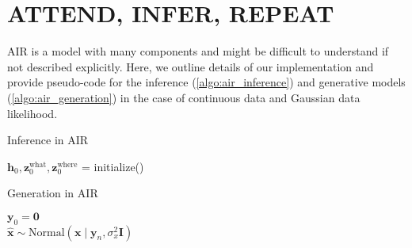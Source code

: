 \section{ATTEND, INFER, REPEAT}
\label{app:air}

\Gls{AIR} is a model with many components and might be difficult to understand if not described explicitly.
Here, we outline details of our implementation and provide pseudo-code for the inference (\cref{algo:air_inference}) and generative models (\cref{algo:air_generation}) in the case of continuous data and Gaussian data likelihood.

\begin{algorithm}[!h]
    \caption{Inference in \gls{AIR}}
    \label{algo:air_inference}
    \DontPrintSemicolon
    \SetSideCommentLeft
    $\bm{h}_0, \bm{z}^\text{what}_0, \bm{z}^\text{where}_0$ = initialize()\\
\end{algorithm}
\begin{algorithm}[!h]
    \caption{Generation in \gls{AIR}}
    \label{algo:air_generation}
    \DontPrintSemicolon
    \SetSideCommentLeft
    $\bm{y}_0 = \bm{0}$\\
    $\hat{\bm{x}} \sim \mathrm{Normal} \left(\bm{x} \mid \bm{y}_n, \sigma^2_x \bm{I} \right)$\\
\end{algorithm}
\vspace*{-2ex}

